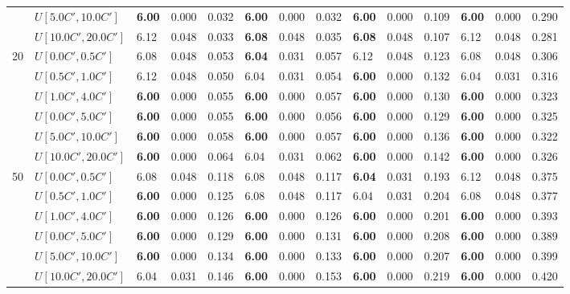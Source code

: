 \begin{table}[h]
{\begin{tabular}{|l|l||l|l|l||l|l|l||l|l|l||l|l|l|}
       & $U[5.0C',10.0C']$ & \textbf{6.00} & 0.000 & 0.032 & \textbf{6.00} & 0.000 & 0.032 & \textbf{6.00} & 0.000 & 0.109 & \textbf{6.00} & 0.000 & 0.290 \\
       & $U[10.0C',20.0C']$ & 6.12 & 0.048 & 0.033 & \textbf{6.08} & 0.048 & 0.035 & \textbf{6.08} & 0.048 & 0.107 & 6.12 & 0.048 & 0.281 \\
      \hline\hline
      \multirow{6}{*}{20} & $U[0.0C',0.5C']$ & 6.08 & 0.048 & 0.053 & \textbf{6.04} & 0.031 & 0.057 & 6.12 & 0.048 & 0.123 & 6.08 & 0.048 & 0.306 \\
       & $U[0.5C',1.0C']$ & 6.12 & 0.048 & 0.050 & 6.04 & 0.031 & 0.054 & \textbf{6.00} & 0.000 & 0.132 & 6.04 & 0.031 & 0.316 \\
       & $U[1.0C',4.0C']$ & \textbf{6.00} & 0.000 & 0.055 & \textbf{6.00} & 0.000 & 0.057 & \textbf{6.00} & 0.000 & 0.130 & \textbf{6.00} & 0.000 & 0.323 \\
       & $U[0.0C',5.0C']$ & \textbf{6.00} & 0.000 & 0.055 & \textbf{6.00} & 0.000 & 0.056 & \textbf{6.00} & 0.000 & 0.129 & \textbf{6.00} & 0.000 & 0.325 \\
       & $U[5.0C',10.0C']$ & \textbf{6.00} & 0.000 & 0.058 & \textbf{6.00} & 0.000 & 0.057 & \textbf{6.00} & 0.000 & 0.136 & \textbf{6.00} & 0.000 & 0.322 \\
       & $U[10.0C',20.0C']$ & \textbf{6.00} & 0.000 & 0.064 & 6.04 & 0.031 & 0.062 & \textbf{6.00} & 0.000 & 0.142 & \textbf{6.00} & 0.000 & 0.326 \\
      \hline\hline
      \multirow{6}{*}{50} & $U[0.0C',0.5C']$ & 6.08 & 0.048 & 0.118 & 6.08 & 0.048 & 0.117 & \textbf{6.04} & 0.031 & 0.193 & 6.12 & 0.048 & 0.375 \\
       & $U[0.5C',1.0C']$ & \textbf{6.00} & 0.000 & 0.125 & 6.08 & 0.048 & 0.117 & 6.04 & 0.031 & 0.204 & 6.08 & 0.048 & 0.377 \\
       & $U[1.0C',4.0C']$ & \textbf{6.00} & 0.000 & 0.126 & \textbf{6.00} & 0.000 & 0.126 & \textbf{6.00} & 0.000 & 0.201 & \textbf{6.00} & 0.000 & 0.393 \\
       & $U[0.0C',5.0C']$ & \textbf{6.00} & 0.000 & 0.129 & \textbf{6.00} & 0.000 & 0.131 & \textbf{6.00} & 0.000 & 0.208 & \textbf{6.00} & 0.000 & 0.389 \\
       & $U[5.0C',10.0C']$ & \textbf{6.00} & 0.000 & 0.134 & \textbf{6.00} & 0.000 & 0.133 & \textbf{6.00} & 0.000 & 0.207 & \textbf{6.00} & 0.000 & 0.399 \\
       & $U[10.0C',20.0C']$ & 6.04 & 0.031 & 0.146 & \textbf{6.00} & 0.000 & 0.153 & \textbf{6.00} & 0.000 & 0.219 & \textbf{6.00} & 0.000 & 0.420 \\
      \hline
      \end{tabular}
      }
      \label{tab:pcpn70}\end{table}


